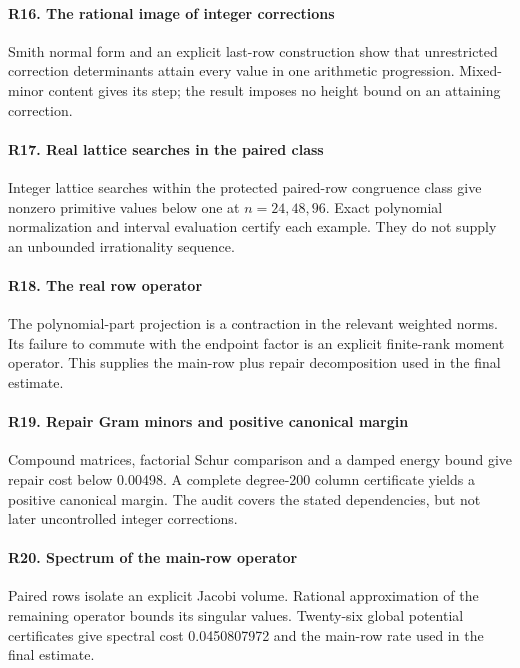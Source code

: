 \paragraph{R16. The rational image of integer corrections}\label{record-R16}
Smith normal form and an explicit last-row construction show that unrestricted correction determinants attain every value in one arithmetic progression. Mixed-minor content gives its step; the result imposes no height bound on an attaining correction.

\paragraph{R17. Real lattice searches in the paired class}\label{record-R17}
Integer lattice searches within the protected paired-row congruence class give nonzero primitive values below one at $n=24,48,96$. Exact polynomial normalization and interval evaluation certify each example. They do not supply an unbounded irrationality sequence.

\paragraph{R18. The real row operator}\label{record-R18}
The polynomial-part projection is a contraction in the relevant weighted norms. Its failure to commute with the endpoint factor is an explicit finite-rank moment operator. This supplies the main-row plus repair decomposition used in the final estimate.

\paragraph{R19. Repair Gram minors and positive canonical margin}\label{record-R19}
Compound matrices, factorial Schur comparison and a damped energy bound give repair cost below 0.00498. A complete degree-200 column certificate yields a positive canonical margin. The audit covers the stated dependencies, but not later uncontrolled integer corrections.

\paragraph{R20. Spectrum of the main-row operator}\label{record-R20}
Paired rows isolate an explicit Jacobi volume. Rational approximation of the remaining operator bounds its singular values. Twenty-six global potential certificates give spectral cost 0.0450807972 and the main-row rate used in the final estimate.

